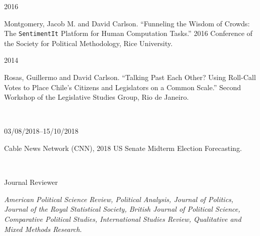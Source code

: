 \documentclass[12pt]{article}
\begin{document}
\begin{minipage}[t]{.15\textwidth}
2016\\
\end{minipage}
\begin{minipage}[t]{.8\textwidth}
\FlushLeft
Montgomery, Jacob M. and David Carlson. ``Funneling the Wisdom of Crowds: The \texttt{SentimentIt} Platform for Human Computation Tasks.'' 2016 Conference of the Society for Political Methodology, Rice University.\\
\end{minipage}
\vspace{.35cm}


\begin{minipage}[t]{.15\textwidth}
2014\\
\end{minipage}
\begin{minipage}[t]{.8\textwidth}
\FlushLeft
Rosas, Guillermo and David Carlson. ``Talking Past Each Other? Using Roll-Call Votes to Place Chile's Citizens and Legislators on a Common Scale.'' Second Workshop of the Legislative Studies Group, Rio de Janeiro.\\
\end{minipage}

\vspace{1cm}

\\
\vspace{.35cm}

\begin{minipage}[t]{.3\textwidth}
03/08/2018--15/10/2018\\
\end{minipage}
\begin{minipage}[t]{.6\textwidth}
\FlushLeft
Cable News Network (CNN), 2018 US Senate Midterm Election Forecasting.\\
\end{minipage}

\vspace{1cm}
\\
\vspace{.35cm}

\begin{minipage}[t]{.3\textwidth}
Journal Reviewer\\
\end{minipage}
\begin{minipage}[t]{.6\textwidth}
\FlushLeft
\emph{American Political Science Review, Political Analysis, Journal of Politics, Journal of the Royal Statistical Society, British Journal of Political Science, Comparative Political Studies, International Studies Review, Qualitative and Mixed Methods Research}.\\
\end{minipage}
\end{document}
